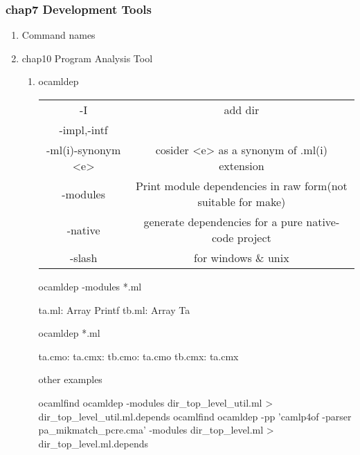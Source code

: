 \subsubsection{chap7 Development Tools}
\label{sec:chap7-devel-tools}
\begin{enumerate}

\item Command names  \\
  

  


\item chap10 Program Analysis Tool \\
  \begin{enumerate}
  \item ocamldep \\

    
    \begin{tabular}{|c|c|}
      -I & add dir \\
      -impl,-intf & \\
      -ml(i)-synonym <e> & cosider <e> as a synonym of .ml(i) extension \\
      -modules & Print module dependencies in raw form(not suitable for make) \\
      -native & generate dependencies for a pure native-code project \\
      -slash & for windows \& unix \\
    \end{tabular}

    
\begin{ocamlcode}
ocamldep -modules *.ml      
\end{ocamlcode}

\begin{ocamlcode}
ta.ml: Array Printf
tb.ml: Array Ta
\end{ocamlcode}

  \begin{ocamlcode}
ocamldep *.ml    
\end{ocamlcode}


\begin{ocamlcode}
ta.cmo:
ta.cmx:
tb.cmo: ta.cmo
tb.cmx: ta.cmx
\end{ocamlcode}

other examples

\begin{bluetext}
ocamlfind ocamldep -modules dir_top_level_util.ml > dir_top_level_util.ml.depends
ocamlfind ocamldep -pp 'camlp4of -parser pa_mikmatch_pcre.cma' -modules dir_top_level.ml > dir_top_level.ml.depends
\end{bluetext}


\end{enumerate}
\end{enumerate}
